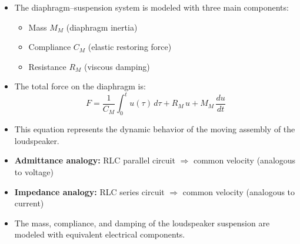 \begin{tcolorbox}[colback=gray!10!white,colframe=black,title=\textbf{Summary – Mechanical Section of the Loudspeaker}]
\begin{itemize}
    \item The diaphragm–suspension system is modeled with three main components:
    \begin{itemize}
        \item Mass \( M_M \) (diaphragm inertia)
        \item Compliance \( C_M \) (elastic restoring force)
        \item Resistance \( R_M \) (viscous damping)
    \end{itemize}
    \item The total force on the diaphragm is:
    \[
    F = \frac{1}{C_M} \int_0^t u(\tau) \, d\tau + R_M \, u + M_M \, \frac{du}{dt}
    \]
    \item This equation represents the dynamic behavior of the moving assembly of the loudspeaker.
\end{itemize}
\end{tcolorbox}


\begin{tcolorbox}[colback=gray!10!white,colframe=black,title=\textbf{Summary – Mechanical Analogies}]
\begin{itemize}
    \item \textbf{Admittance analogy:} RLC parallel circuit  
    \( \Rightarrow \) common velocity (analogous to voltage)
    \item \textbf{Impedance analogy:} RLC series circuit  
    \( \Rightarrow \) common velocity (analogous to current)
    \item The mass, compliance, and damping of the loudspeaker suspension are modeled with equivalent electrical components.
\end{itemize}
\end{tcolorbox}

